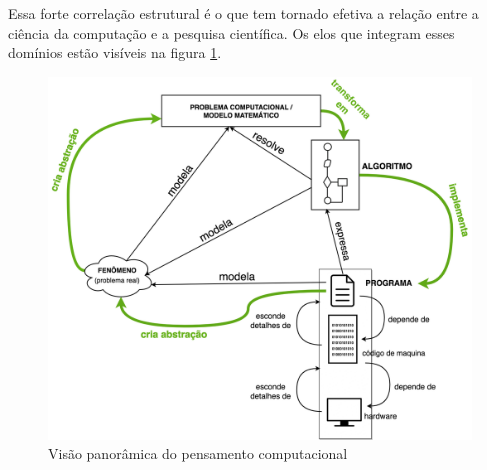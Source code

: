 Essa forte correlação estrutural é o que tem tornado efetiva a relação entre a ciência da computação e a pesquisa científica. Os elos que integram esses domínios estão visíveis na figura \ref{fig:elos}. 


\begin{figure}
	\caption{Visão panorâmica do pensamento computacional}\label{fig:elos}
	\begin{center}
		\includegraphics[scale=0.30]{imagens/elos}
	\end{center}
\end{figure}











